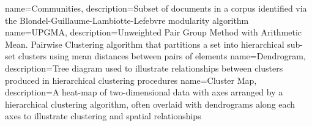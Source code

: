 {
name={Communities},
description={Subset of documents in a corpus identified via the Blondel-Guillaume-Lambiotte-Lefebvre modularity algorithm \cite{modularity1}\cite{modularity2}} 
}
{
name={UPGMA},
description={Unweighted Pair Group Method with Arithmetic Mean. Pairwise Clustering algorithm that partitions a set into hierarchical sub-set clusters using mean distances between pairs of elements \cite{heatmapcluster}} 
}
{
name={Dendrogram},
description={Tree diagram used to illustrate relationships between clusters produced in hierarchical clustering procedures \cite{dendrogram}} 
}
{
name={Cluster Map},
description={A heat-map of two-dimensional data with axes arranged by a hierarchical clustering algorithm, often overlaid with dendrograms along each axes to illustrate clustering and spatial relationships \cite{dendrogram}\cite{seaborn}\cite{scipy}} 
}